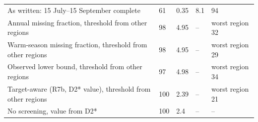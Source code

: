 \begin{table}
{\begin{tabular}{p{}p{}p{}p{}p{}}
As written: 15 July--15 September complete & 61 & 0.35 & 8.1 & 94 \\
Annual missing fraction, threshold from other regions & 98 & 4.95 & -- & worst region 32 \\
Warm-season missing fraction, threshold from other regions & 98 & 4.95 & -- & worst region 29 \\
Observed lower bound, threshold from other regions & 97 & 4.98 & -- & worst region 34 \\
Target-aware (R7b, D2* value), threshold from other regions & 100 & 2.39 & -- & worst region 21 \\
No screening, value from D2* & 100 & 2.4 & -- & -- \\
\bottomrule
\end{tabular}
}
\end{table}
